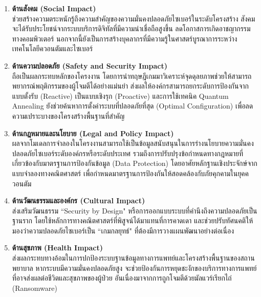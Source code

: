 \begin{enumerate}
    \item \textbf{ด้านสังคม (Social Impact)} 
    \\ ช่วยสร้างความตระหนักรู้ถึงความสำคัญของความมั่นคงปลอดภัยไซเบอร์ในระดับโครงสร้าง สังคมจะได้รับประโยชน์จากระบบบริการดิจิทัลที่มีความน่าเชื่อถือสูงขึ้น ลดโอกาสการเกิดอาชญากรรมทางคอมพิวเตอร์ นอกจากนี้ยังเป็นการสร้างบุคลากรที่มีความรู้ในศาสตร์บูรณาการระหว่างเทคโนโลยีควอนตัมและไซเบอร์

    \item \textbf{ด้านความปลอดภัย (Safety and Security Impact)} 
    \\ ถือเป็นผลกระทบหลักของโครงงาน โดยการนำทฤษฎีเกมมาวิเคราะห์จุดดุลยภาพช่วยให้สามารถพยากรณ์พฤติกรรมของผู้โจมตีได้อย่างแม่นยำ ส่งผลให้องค์กรสามารถยกระดับการป้องกันจากแบบตั้งรับ (Reactive) เป็นแบบเชิงรุก (Proactive) และการใช้เทคนิค Quantum Annealing ยังช่วยค้นหาการตั้งค่าระบบที่ปลอดภัยที่สุด (Optimal Configuration) เพื่อลดความเปราะบางของโครงสร้างพื้นฐานที่สำคัญ
    

    \item \textbf{ด้านกฎหมายและนโยบาย (Legal and Policy Impact)} 
    \\ผลจากโมเดลการจำลองในโครงงานสามารถใช้เป็นข้อมูลสนับสนุนในการร่างนโยบายความมั่นคงปลอดภัยไซเบอร์ระดับองค์กรหรือระดับประเทศ รวมถึงการปรับปรุงข้อกำหนดทางกฎหมายที่เกี่ยวข้องกับมาตรฐานการป้องกันข้อมูล (Data Protection) โดยอาศัยหลักฐานเชิงประจักษ์จากแบบจำลองทางคณิตศาสตร์ เพื่อกำหนดมาตรฐานการป้องกันให้สอดคล้องกับภัยคุกคามในยุคควอนตัม

    \item \textbf{ด้านวัฒนธรรมและองค์กร (Cultural Impact)} 
    \\ส่งเสริมวัฒนธรรม ``Security by Design" หรือการออกแบบระบบที่คำนึงถึงความปลอดภัยเป็นฐานราก โดยใช้หลักการทางคณิตศาสตร์ที่พิสูจน์ได้มาแทนที่การคาดเดา และช่วยปรับทัศนคติให้มองว่าความปลอดภัยไซเบอร์เป็น ``เกมกลยุทธ์" ที่ต้องมีการวางแผนพัฒนาอย่างต่อเนื่อง

    \item \textbf{ด้านสุขภาพ (Health Impact)} 
    \\ส่งผลกระทบทางอ้อมในการปกป้องระบบฐานข้อมูลทางการแพทย์และโครงสร้างพื้นฐานของสถานพยาบาล หากระบบมีความมั่นคงปลอดภัยสูง จะช่วยป้องกันการหยุดชะงักของบริการทางการแพทย์ที่อาจส่งผลต่อชีวิตและสุขภาพของผู้ป่วย อันเนื่องมาจากการถูกโจมตีด้วยมัลแวร์เรียกไถ่ (Ransomware)
    
\end{enumerate}

